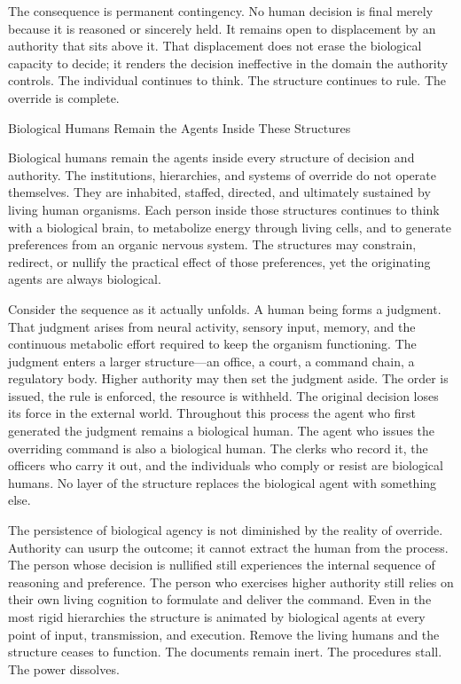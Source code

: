 The consequence is permanent contingency. No human decision is final merely because it is reasoned or sincerely held. It remains open to displacement by an authority that sits above it. That displacement does not erase the biological capacity to decide; it renders the decision ineffective in the domain the authority controls. The individual continues to think. The structure continues to rule. The override is complete.

Biological Humans Remain the Agents Inside These Structures

Biological humans remain the agents inside every structure of decision and authority. The institutions, hierarchies, and systems of override do not operate themselves. They are inhabited, staffed, directed, and ultimately sustained by living human organisms. Each person inside those structures continues to think with a biological brain, to metabolize energy through living cells, and to generate preferences from an organic nervous system. The structures may constrain, redirect, or nullify the practical effect of those preferences, yet the originating agents are always biological.

Consider the sequence as it actually unfolds. A human being forms a judgment. That judgment arises from neural activity, sensory input, memory, and the continuous metabolic effort required to keep the organism functioning. The judgment enters a larger structure—an office, a court, a command chain, a regulatory body. Higher authority may then set the judgment aside. The order is issued, the rule is enforced, the resource is withheld. The original decision loses its force in the external world. Throughout this process the agent who first generated the judgment remains a biological human. The agent who issues the overriding command is also a biological human. The clerks who record it, the officers who carry it out, and the individuals who comply or resist are biological humans. No layer of the structure replaces the biological agent with something else.

The persistence of biological agency is not diminished by the reality of override. Authority can usurp the outcome; it cannot extract the human from the process. The person whose decision is nullified still experiences the internal sequence of reasoning and preference. The person who exercises higher authority still relies on their own living cognition to formulate and deliver the command. Even in the most rigid hierarchies the structure is animated by biological agents at every point of input, transmission, and execution. Remove the living humans and the structure ceases to function. The documents remain inert. The procedures stall. The power dissolves.

